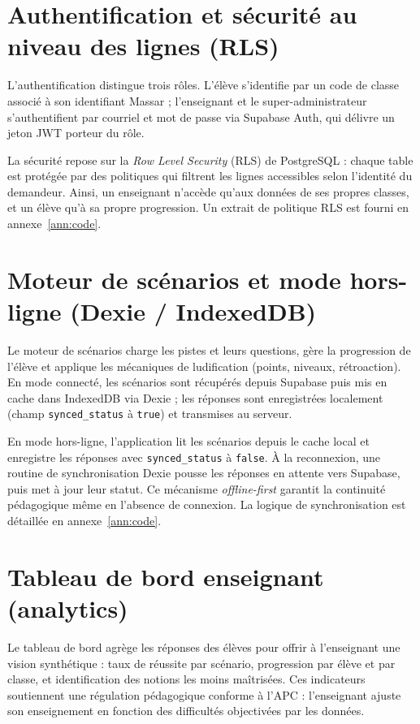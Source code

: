 \documentclass[12pt, a4paper, oneside]{report}
\begin{document}
\section{Authentification et sécurité au niveau des lignes (RLS)}
L'authentification distingue trois rôles. L'élève s'identifie par un code de classe associé à son identifiant Massar ; l'enseignant et le super-administrateur s'authentifient par courriel et mot de passe via Supabase Auth, qui délivre un jeton JWT porteur du rôle.

La sécurité repose sur la \textit{Row Level Security} (RLS) de PostgreSQL : chaque table est protégée par des politiques qui filtrent les lignes accessibles selon l'identité du demandeur. Ainsi, un enseignant n'accède qu'aux données de ses propres classes, et un élève qu'à sa propre progression. Un extrait de politique RLS est fourni en annexe~\ref{ann:code}.

\section{Moteur de scénarios et mode hors-ligne (Dexie / IndexedDB)}
Le moteur de scénarios charge les pistes et leurs questions, gère la progression de l'élève et applique les mécaniques de ludification (points, niveaux, rétroaction). En mode connecté, les scénarios sont récupérés depuis Supabase puis mis en cache dans IndexedDB via Dexie ; les réponses sont enregistrées localement (champ \texttt{synced\_status} à \texttt{true}) et transmises au serveur.

En mode hors-ligne, l'application lit les scénarios depuis le cache local et enregistre les réponses avec \texttt{synced\_status} à \texttt{false}. À la reconnexion, une routine de synchronisation Dexie pousse les réponses en attente vers Supabase, puis met à jour leur statut. Ce mécanisme \textit{offline-first} garantit la continuité pédagogique même en l'absence de connexion. La logique de synchronisation est détaillée en annexe~\ref{ann:code}.

\section{Tableau de bord enseignant (analytics)}
Le tableau de bord agrège les réponses des élèves pour offrir à l'enseignant une vision synthétique : taux de réussite par scénario, progression par élève et par classe, et identification des notions les moins maîtrisées. Ces indicateurs soutiennent une régulation pédagogique conforme à l'APC : l'enseignant ajuste son enseignement en fonction des difficultés objectivées par les données.
\end{document}
